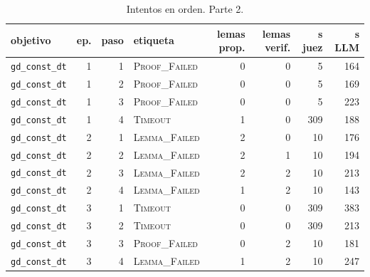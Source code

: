 \documentclass[11pt,a4paper]{article}
\begin{document}
\begin{table}[!ht]
\centering
\footnotesize
\setlength{\tabcolsep}{4pt}
\begin{tabular}{@{}lrrlrrrr@{}}
\toprule
objetivo & ep. & paso & etiqueta & lemas prop. & lemas verif. & s juez & s LLM \\
\midrule
\texttt{gd\_\allowbreak{}const\_\allowbreak{}dt} & 1 & 1 & \textsc{Proof\_Failed} & 0 & 0 & 5 & 164 \\
\texttt{gd\_\allowbreak{}const\_\allowbreak{}dt} & 1 & 2 & \textsc{Proof\_Failed} & 0 & 0 & 5 & 169 \\
\texttt{gd\_\allowbreak{}const\_\allowbreak{}dt} & 1 & 3 & \textsc{Proof\_Failed} & 0 & 0 & 5 & 223 \\
\texttt{gd\_\allowbreak{}const\_\allowbreak{}dt} & 1 & 4 & \textsc{Timeout} & 1 & 0 & 309 & 188 \\
\texttt{gd\_\allowbreak{}const\_\allowbreak{}dt} & 2 & 1 & \textsc{Lemma\_Failed} & 2 & 0 & 10 & 176 \\
\texttt{gd\_\allowbreak{}const\_\allowbreak{}dt} & 2 & 2 & \textsc{Lemma\_Failed} & 2 & 1 & 10 & 194 \\
\texttt{gd\_\allowbreak{}const\_\allowbreak{}dt} & 2 & 3 & \textsc{Lemma\_Failed} & 2 & 2 & 10 & 213 \\
\texttt{gd\_\allowbreak{}const\_\allowbreak{}dt} & 2 & 4 & \textsc{Lemma\_Failed} & 1 & 2 & 10 & 143 \\
\texttt{gd\_\allowbreak{}const\_\allowbreak{}dt} & 3 & 1 & \textsc{Timeout} & 0 & 0 & 309 & 383 \\
\texttt{gd\_\allowbreak{}const\_\allowbreak{}dt} & 3 & 2 & \textsc{Timeout} & 0 & 0 & 309 & 213 \\
\texttt{gd\_\allowbreak{}const\_\allowbreak{}dt} & 3 & 3 & \textsc{Proof\_Failed} & 0 & 2 & 10 & 181 \\
\texttt{gd\_\allowbreak{}const\_\allowbreak{}dt} & 3 & 4 & \textsc{Lemma\_Failed} & 1 & 2 & 10 & 247 \\
\bottomrule
\end{tabular}
\caption{Intentos en orden. Parte 2.}
\label{tab:intentos-1}
\end{table}
\end{document}
